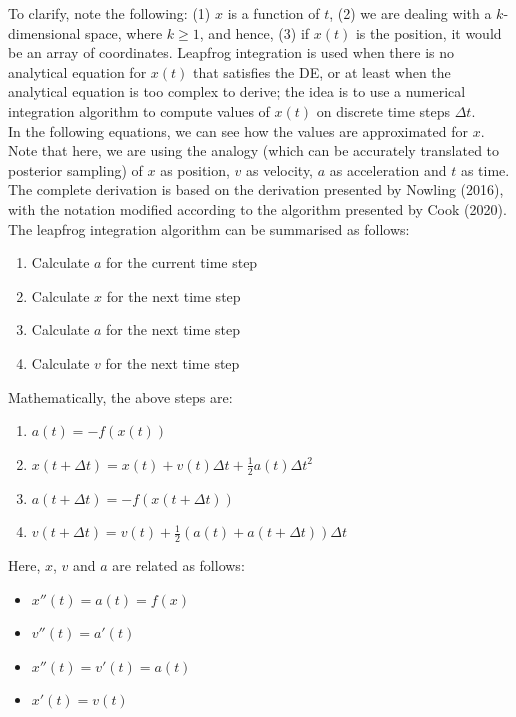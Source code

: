 \documentclass[conference]{IEEEtran}
\begin{document}
To clarify, note the following: (1) $x$ is a function of $t$, (2) we are dealing with a $k$-dimensional space, where $k \geq 1$, and hence, (3) if $x(t)$ is the position, it would be an array of coordinates. Leapfrog integration is used when there is no analytical equation for $x(t)$ that satisfies the DE, or at least when the analytical equation is too complex to derive; the idea is to use a numerical integration algorithm to compute values of $x(t)$ on discrete time steps $\Delta t$.\\ In the following equations, we can see how the values are approximated for $x$. Note that here, we are using the analogy (which can be accurately translated to posterior sampling) of $x$ as position, $v$ as velocity, $a$ as acceleration and $t$ as time. The complete derivation is based on the derivation presented by Nowling (2016), with the notation modified according to the algorithm presented by Cook (2020). The leapfrog integration algorithm can be summarised as follows:\\

\begin{enumerate}
	\item Calculate $a$ for the current time step
	\item Calculate $x$ for the next time step
	\item Calculate $a$ for the next time step
	\item Calculate $v$ for the next time step\\
\end{enumerate}

Mathematically, the above steps are:\\

\begin{enumerate}
	\item $a(t) = -f(x(t))$
	\item $x(t + \Delta t) = x(t) + v(t)\Delta t + \frac{1}{2}a(t)\Delta t^2$
	\item $a(t + \Delta t) = -f(x(t+\Delta t))$
	\item $v(t + \Delta t)=v(t) + \frac{1}{2}(a(t) + a(t + \Delta t))\Delta t$\\
\end{enumerate}

Here, $x$, $v$ and $a$ are related as follows:\\

\begin{itemize}
	\item $x''(t) = a(t) = f(x)$
	\item $v''(t) = a'(t)$
	\item $x''(t) = v'(t) = a(t)$
	\item $x'(t) = v(t)$\\
\end{itemize}
\end{document}
